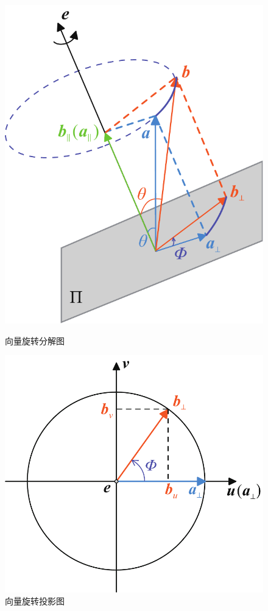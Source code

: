 \begin{figure}[!htb]
	\centering
	\begin{minipage}{0.31\linewidth}
		\centering
		\includegraphics[width=0.9\linewidth]{pic/欧拉轴}
		\vspace*{-1.2em}
		\caption{向量旋转分解图}
		\label{欧拉轴3}
	\end{minipage}\hspace*{7em}
	\begin{minipage}{0.348\linewidth}
		\centering
		\includegraphics[width=\linewidth]{pic/欧拉轴2}
		\caption{向量旋转投影图}
		\label{欧拉轴4}
	\end{minipage}
\end{figure}

